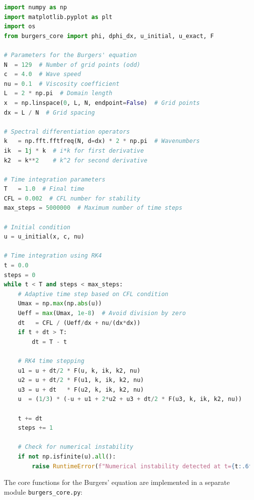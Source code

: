 \documentclass{article}
\begin{document}
\begin{lstlisting}[language=Python]
import numpy as np
import matplotlib.pyplot as plt
import os
from burgers_core import phi, dphi_dx, u_initial, u_exact, F

# Parameters for the Burgers' equation
N  = 129  # Number of grid points (odd)
c  = 4.0  # Wave speed
nu = 0.1  # Viscosity coefficient
L  = 2 * np.pi  # Domain length
x  = np.linspace(0, L, N, endpoint=False)  # Grid points
dx = L / N  # Grid spacing

# Spectral differentiation operators
k   = np.fft.fftfreq(N, d=dx) * 2 * np.pi  # Wavenumbers
ik  = 1j * k  # i*k for first derivative
k2  = k**2    # k^2 for second derivative

# Time integration parameters
T   = 1.0  # Final time
CFL = 0.002  # CFL number for stability
max_steps = 5000000  # Maximum number of time steps

# Initial condition
u = u_initial(x, c, nu)

# Time integration using RK4
t = 0.0
steps = 0
while t < T and steps < max_steps:
    # Adaptive time step based on CFL condition
    Umax = np.max(np.abs(u))
    Ueff = max(Umax, 1e-8)  # Avoid division by zero
    dt   = CFL / (Ueff/dx + nu/(dx*dx))
    if t + dt > T:
        dt = T - t
    
    # RK4 time stepping
    u1 = u + dt/2 * F(u, k, ik, k2, nu)
    u2 = u + dt/2 * F(u1, k, ik, k2, nu)
    u3 = u + dt   * F(u2, k, ik, k2, nu)
    u  = (1/3) * (-u + u1 + 2*u2 + u3 + dt/2 * F(u3, k, ik, k2, nu))
    
    t += dt
    steps += 1
    
    # Check for numerical instability
    if not np.isfinite(u).all():
        raise RuntimeError(f"Numerical instability detected at t={t:.6f} (CFL={CFL})")
\end{lstlisting}

The core functions for the Burgers' equation are implemented in a separate module \texttt{burgers\_core.py}:
\end{document}
